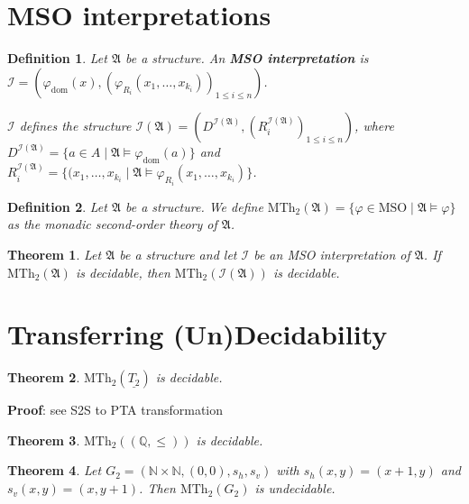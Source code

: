 \documentclass{article}
\newtheorem{theorem}{Theorem}
\newtheorem{definition}{Definition}
\begin{document}
\section{MSO interpretations}
\begin{definition}
	Let $\mathfrak{A}$ be a structure. An \textbf{MSO interpretation} is $\mathcal{I} = (\varphi_\text{dom}(x), (\varphi_{R_i}(x_1, \dots, x_{k_i}))_{1 \leq i \leq n})$. 

	$\mathcal{I}$ defines the structure $\mathcal{I}(\mathfrak{A}) = ( D^{\mathcal{I}(\mathfrak{A})}, (R_i^{\mathcal{I}(\mathfrak{A})})_{1 \leq i \leq n})$, where $D^{\mathcal{I}(\mathfrak{A})} = \{ a \in A \mid \mathfrak{A} \models \varphi_\text{dom}(a) \}$ and $R_i^{\mathcal{I}(\mathfrak{A})} = \{(x_1, \dots, x_{k_i} \mid \mathfrak{A} \models \varphi_{R_i}(x_1, \dots, x_{k_i})\}$.
\end{definition}

\begin{definition}
	Let $\mathfrak{A}$ be a structure. We define $\text{MTh}_2(\mathfrak{A}) = \{ \varphi \in \text{MSO} \mid \mathfrak{A} \models \varphi \}$ as the monadic second-order theory of $\mathfrak{A}$.
\end{definition}

\begin{theorem}
\label{thm:transf_dec}
	Let $\mathfrak{A}$ be a structure and let $\mathcal{I}$ be an MSO interpretation of $\mathfrak{A}$. If $\text{MTh}_2(\mathfrak{A})$ is decidable, then $\text{MTh}_2(\mathcal{I}(\mathfrak{A}))$ is decidable.
\end{theorem}

\section{Transferring (Un)Decidability}
\begin{theorem}
	$\text{MTh}_2(\underline{T_2})$ is decidable.
\end{theorem}
\textbf{Proof}: see S2S to PTA transformation

\begin{theorem}
	$\text{MTh}_2((\mathbb{Q}, \leq))$ is decidable.
\end{theorem}

\begin{theorem}
	Let $G_2 = (\mathbb{N} \times \mathbb{N}, (0, 0), s_h, s_v)$ with $s_h(x, y) = (x+1, y)$ and $s_v(x, y) = (x, y+1)$. Then $\text{MTh}_2(G_2)$ is undecidable.
\end{theorem}
\end{document}
